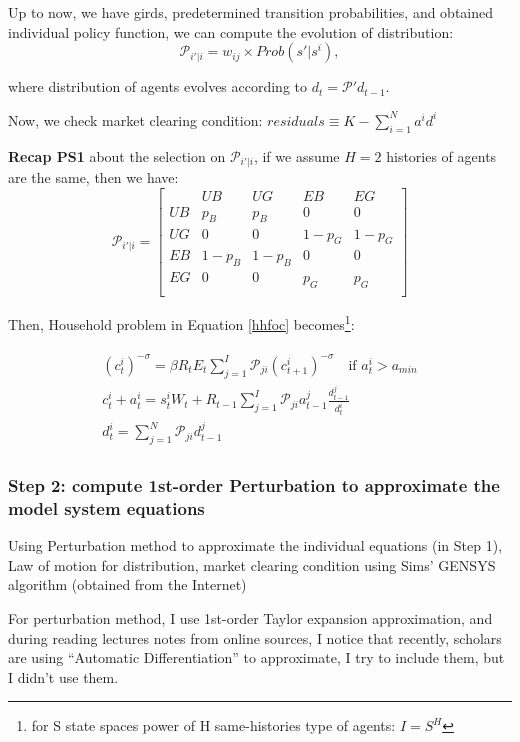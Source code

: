 Up to now, we have girds, predetermined transition probabilities, and obtained individual policy function, we can compute the {\color{red} evolution of distribution}: 
\[ \mathcal{P}_{i'|i} = w_{ij} \times Prob(s'| s^i), \]

where distribution of agents evolves according to $d_t = \mathcal{P'} d_{t-1}$. 

Now, we check market clearing condition: $residuals \equiv K - \sum_{i=1}^{N}a^i d^i$

\medskip

\textbf{Recap PS1} about the selection on $\mathcal{P}_{i'|i}$, if we assume $H=2$ histories of agents are the same, then we have: 
\[ 
\mathcal{P}_{i'|i}=
\begin{bmatrix}
& UB & UG & EB & EG \\
UB & p_B & p_B & 0 & 0\\ 
UG & 0 & 0 & 1-p_G & 1-p_G\\
EB & 1-p_B & 1-p_B & 0 & 0\\
EG & 0 & 0 & p_G & p_G\\
\end{bmatrix}
\]

Then, Household problem in Equation \ref{hhfoc} becomes\footnote{for S state spaces power of H same-histories type of agents: $I = S^H$}: 

\begin{align}
\begin{split}
(c^i_t)^{-\sigma} = \beta R_t E_t \sum_{j=1}^I \mathcal{P}_{ji} (c^i_{t+1})^{-\sigma} \quad \text{if } a^i_t > a_{min} \\
c^i_t + a^i_t = s^i_t W_t + R_{t-1} \sum_{j=1}^I \mathcal{P}_{ji} a^j_{t-1} \frac{d^j_{t-1}}{d^i_t} \\
d^i_t = \sum_{j=1}^N \mathcal{P}_{ji} d^j_{t-1}
\end{split}
\end{align}

\subsubsection*{Step 2: compute 1st-order Perturbation to approximate the model system equations}

Using Perturbation method to approximate the individual equations (in Step 1), Law of motion for distribution, market clearing condition using Sims' GENSYS algorithm (obtained from the Internet)

For perturbation method, I use 1st-order Taylor expansion approximation, and during reading lectures notes from online sources, I notice that recently, scholars are using ``Automatic Differentiation'' to approximate, I try to include them, but I didn't use them.

